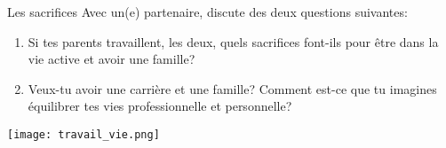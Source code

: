 \begin{frame}{Les sacrifices}
  Avec un(e) partenaire, discute des deux questions suivantes:
  \begin{enumerate}
    \item Si tes parents travaillent, les deux, quels sacrifices font-ils pour être dans la vie active et avoir une famille?
    \item Veux-tu avoir une carrière et une famille? Comment est-ce que tu imagines équilibrer tes vies professionnelle et personnelle?
  \end{enumerate}
  \begin{center}
    \texttt{[image: travail\_vie.png]}
  \end{center}
\end{frame}